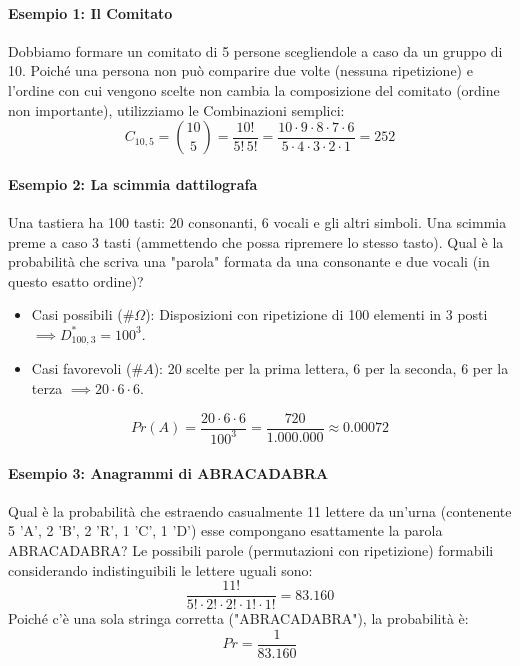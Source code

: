 \documentclass[12pt, a4paper]{article}
\begin{document}
\paragraph{Esempio 1: Il Comitato}
Dobbiamo formare un comitato di 5 persone scegliendole a caso da un gruppo di 10.
Poiché una persona non può comparire due volte (nessuna ripetizione) e l'ordine con cui vengono scelte non cambia la composizione del comitato (ordine non importante), utilizziamo le Combinazioni semplici:
$$ C_{10,5} = \binom{10}{5} = \frac{10!}{5! \, 5!} = \frac{10 \cdot 9 \cdot 8 \cdot 7 \cdot 6}{5 \cdot 4 \cdot 3 \cdot 2 \cdot 1} = 252 $$

\paragraph{Esempio 2: La scimmia dattilografa}
Una tastiera ha 100 tasti: 20 consonanti, 6 vocali e gli altri simboli. Una scimmia preme a caso 3 tasti (ammettendo che possa ripremere lo stesso tasto). Qual è la probabilità che scriva una "parola" formata da una consonante e due vocali (in questo esatto ordine)?
\begin{itemize}
    \item Casi possibili ($\#\Omega$): Disposizioni con ripetizione di 100 elementi in 3 posti $\implies D_{100,3}^* = 100^3$.
    \item Casi favorevoli ($\#A$): 20 scelte per la prima lettera, 6 per la seconda, 6 per la terza $\implies 20 \cdot 6 \cdot 6$.
\end{itemize}
$$ Pr(A) = \frac{20 \cdot 6 \cdot 6}{100^3} = \frac{720}{1.000.000} \approx 0.00072 $$

\paragraph{Esempio 3: Anagrammi di ABRACADABRA}
Qual è la probabilità che estraendo casualmente 11 lettere da un'urna (contenente 5 'A', 2 'B', 2 'R', 1 'C', 1 'D') esse compongano esattamente la parola ABRACADABRA?
Le possibili parole (permutazioni con ripetizione) formabili considerando indistinguibili le lettere uguali sono:
$$ \frac{11!}{5! \cdot 2! \cdot 2! \cdot 1! \cdot 1!} = 83.160 $$
Poiché c'è una sola stringa corretta ("ABRACADABRA"), la probabilità è:
$$ Pr = \frac{1}{83.160} $$
\end{document}
